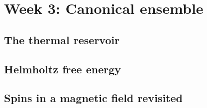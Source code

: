 \renewcommand{\thisweek}{MATH327 Week 3}
\renewcommand{\moddate}{Last modified 3 Feb.~2021}
\setcounter{section}{3}
\setcounter{subsection}{0}
{}
\section*{Week 3: Canonical ensemble}

\subsection{The thermal reservoir}



\newpage %
\subsection{Helmholtz free energy}



\newpage %
\subsection{Spins in a magnetic field revisited}
